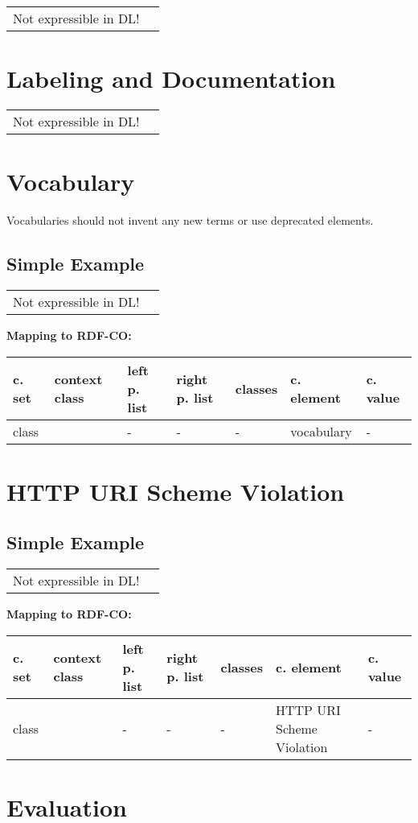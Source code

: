 \documentclass{llncs}
\newenvironment{gcotable}{
  \scriptsize
  \sffamily
  \vspace{0cm}
	\begin{center}
	\textbf{\vspace{0.4cm}Mapping to RDF-CO:} \\
  \begin{tabular}{l|l|l|l|l|l|l}
	\hline
  \textbf{c. set} & \textbf{context class} & \textbf{left p. list} & \textbf{right p. list} & \textbf{classes} & \textbf{c. element} & \textbf{c. value} \\
  \hline

}{
  \hline
  \end{tabular}
	\end{center}
}
\newenvironment{DL}{
\vspace{0cm}
	\begin{center}
  \begin{tabular}{r l}

}{
  \end{tabular}
	\end{center}
}
\begin{document}
\begin{DL}
Not expressible in DL!
\end{DL}

\section{Labeling and Documentation}

\begin{DL}
Not expressible in DL!
\end{DL}

\section{Vocabulary}

Vocabularies should not invent any new terms or use deprecated elements. 

\subsection{Simple Example}

\begin{DL}
Not expressible in DL!
\end{DL}

\begin{gcotable}
class &  & - & - & - & vocabulary & - \\
\end{gcotable}

\section{HTTP URI Scheme Violation}

\subsection{Simple Example}

\begin{DL}
Not expressible in DL!
\end{DL}

\begin{gcotable}
class &  & - & - & - & HTTP URI Scheme Violation & - \\
\end{gcotable}

\section{Evaluation}
\end{document}
